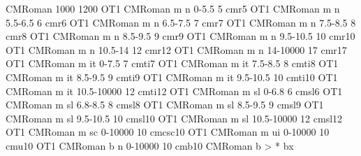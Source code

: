 %
\def\fmap@exists#1#2#3#4{%
  TT\fi %
  \expandafter\let\expandafter\@fmap \csname fmap/#1/#2/#3/#4\endcsname
  \ifx\@fmap\relax
    \fmap@exists@false
  \else
    \@fontnotify{^^J\linenumber Mapping font: #1/#2/#3/#4 -> \@fmap.}%
    \expandafter\font@apply@map \@fmap\finish
    \fmap@exists@true
  \fi
}%
\def\fmap@exists@false{\expandafter\iffalse}%
\def\fmap@exists@true{\expandafter\iftrue}%
%
\def\font@apply@map#1/#2/#3/#4\finish{%
  \begingroup %
    \font@set@attrib {}%
    \font@set@attrib {}%
    \font@set@attrib {}%
    \font@set@attrib {}%
    \selectfont
    \global\expandafter\let\expandafter \gtemp \c@font@command
  \endgroup %
  \global\expandafter\let \c@font@command \gtemp
}%
%
\def\asteriskword{*}%
%
\def\font@set@attrib#1#2{%
  \edef\temp{#2}%
  \ifx\temp\asteriskword
  \else
    \let#1\temp
  \fi
}%
%
%
\declarefontfamily CMRoman 1000 1200
\declarefont OT1 CMRoman m   n  0-5.5      5  cmr5
\declarefont OT1 CMRoman m   n  5.5-6.5    6  cmr6
\declarefont OT1 CMRoman m   n  6.5-7.5    7  cmr7
\declarefont OT1 CMRoman m   n  7.5-8.5    8  cmr8
\declarefont OT1 CMRoman m   n  8.5-9.5    9  cmr9
\declarefont OT1 CMRoman m   n  9.5-10.5   10 cmr10
\declarefont OT1 CMRoman m   n  10.5-14    12 cmr12
\declarefont OT1 CMRoman m   n  14-10000   17 cmr17
\declarefont OT1 CMRoman m   it 0-7.5      7  cmti7
\declarefont OT1 CMRoman m   it 7.5-8.5    8  cmti8
\declarefont OT1 CMRoman m   it 8.5-9.5    9  cmti9
\declarefont OT1 CMRoman m   it 9.5-10.5   10 cmti10
\declarefont OT1 CMRoman m   it 10.5-10000 12 cmti12
\declarefont OT1 CMRoman m   sl 0-6.8      6  cmsl6 %
\declarefont OT1 CMRoman m   sl 6.8-8.5    8  cmsl8
\declarefont OT1 CMRoman m   sl 8.5-9.5    9  cmsl9
\declarefont OT1 CMRoman m   sl 9.5-10.5   10 cmsl10
\declarefont OT1 CMRoman m   sl 10.5-10000 12 cmsl12
\declarefont OT1 CMRoman m   sc 0-10000    10 cmcsc10
\declarefont OT1 CMRoman m   ui 0-10000    10 cmu10
%
\declarefont OT1 CMRoman b   n  0-10000    10 cmb10
\fontmapseries CMRoman b > * bx
%
